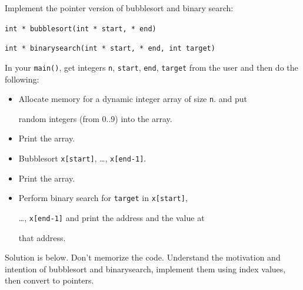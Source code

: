 Implement the pointer version of bubblesort and binary search:



\verb!int * bubblesort(int * start, * end)!



\verb!int * binarysearch(int * start, * end, int target)!



In your \texttt{main()}, get integers \texttt{n}, \texttt{start}, \texttt{end}, \texttt{target} from the user and then do the following:



\begin{itemize}

\item

  Allocate memory for a dynamic integer array of size \texttt{n}. and put

  random integers (from 0..9) into the array.

\item

  Print the array.

\item

  Bubblesort \texttt{x[start]}, \ldots, \texttt{x[end-1]}.

\item

  Print the array.

\item

  Perform binary search for \texttt{target} in \texttt{x[start]},

  \ldots, \texttt{x[end-1]} and print the address and the value at

  that address.

\end{itemize}



Solution is below. Don't memorize the code. Understand the motivation and intention of bubblesort and binarysearch, implement them using index values, then convert to pointers.



